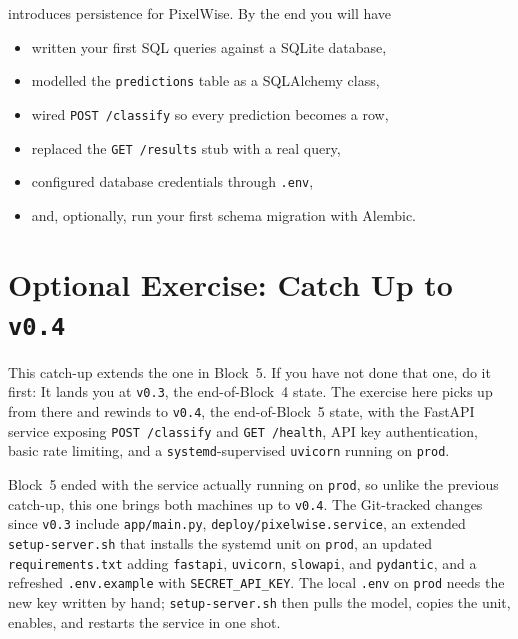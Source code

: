  introduces persistence for PixelWise.
By the end you will have
\begin{itemize}
    \item written your first SQL queries against a SQLite database,
    \item modelled the \texttt{predictions} table as a SQLAlchemy class,
    \item wired \texttt{POST /classify} so every prediction becomes a row,
    \item replaced the \texttt{GET /results} stub with a real query,
    \item configured database credentials through \texttt{.env},
    \item and, optionally, run your first schema migration with Alembic.
\end{itemize}



\newpage
\section{Optional Exercise: Catch Up to \texttt{v0.4}}


This catch-up extends the one in Block~5. If you have not done that one,
do it first: It lands you at \texttt{v0.3}, the end-of-Block~4 state.
The exercise here picks up from there and rewinds to \texttt{v0.4}, the
end-of-Block~5 state, with the FastAPI service exposing
\texttt{POST /classify} and \texttt{GET /health}, API key authentication,
basic rate limiting, and a \texttt{systemd}-supervised \texttt{uvicorn}
running on \texttt{prod}.

 Block~5 ended with the service actually
running on \texttt{prod}, so unlike the previous catch-up, this one
brings both machines up to \texttt{v0.4}. The Git-tracked changes since
\texttt{v0.3} include \texttt{app/main.py},
\texttt{deploy/pixelwise.service}, an extended \texttt{setup-server.sh}
that installs the systemd unit on \texttt{prod}, an updated
\texttt{requirements.txt} adding \texttt{fastapi}, \texttt{uvicorn},
\texttt{slowapi}, and \texttt{pydantic}, and a refreshed
\texttt{.env.example} with \texttt{SECRET\_API\_KEY}. The local
\texttt{.env} on \texttt{prod} needs the new key written by hand;
\texttt{setup-server.sh} then pulls the model, copies the unit,
enables, and restarts the service in one shot.


